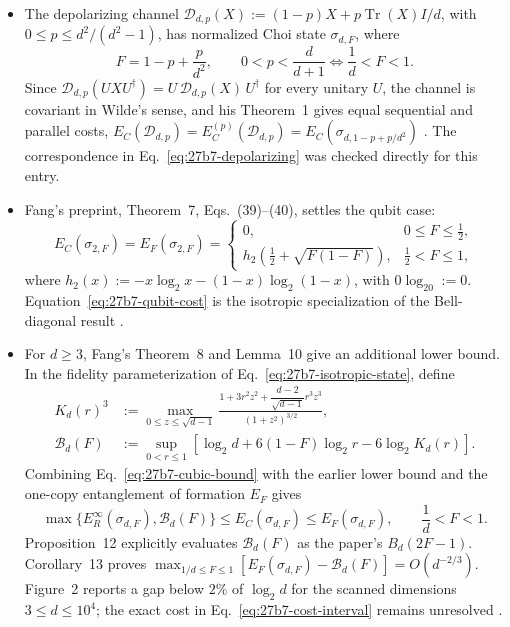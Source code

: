 \begin{itemize}
  \item The depolarizing channel
  $\mathcal D_{d,p}(X):=(1-p)X+p\operatorname{Tr}(X)I/d$, with
  $0\leq p\leq d^2/(d^2-1)$, has normalized Choi state $\sigma_{d,F}$, where
  \begin{equation}
    F=1-p+\frac{p}{d^2},
    \qquad
    0<p<\frac{d}{d+1}\iff\frac1d<F<1 .
    \label{eq:27b7-depolarizing}
  \end{equation}
  Since $\mathcal D_{d,p}(UXU^\dagger)=U\,\mathcal D_{d,p}(X)\,U^\dagger$ for
  every unitary $U$, the channel is covariant in Wilde's sense, and his
  Theorem~1 gives equal sequential and parallel costs,
  $E_C(\mathcal D_{d,p})=E_C^{(p)}(\mathcal D_{d,p})=E_C(\sigma_{d,1-p+p/d^2})$
  .  The correspondence in
  Eq.~\eqref{eq:27b7-depolarizing} was checked directly for this entry.

  \item Fang's preprint, Theorem~7, Eqs.~(39)--(40), settles the qubit case:
  \begin{equation}
    E_C(\sigma_{2,F})=E_F(\sigma_{2,F})=
    \begin{cases}
      0, & 0\leq F\leq\tfrac12,\\
      h_2\!\left(\tfrac12+\sqrt{F(1-F)}\right), & \tfrac12<F\leq1,
    \end{cases}
    \label{eq:27b7-qubit-cost}
  \end{equation}
  where $h_2(x):=-x\log_2x-(1-x)\log_2(1-x)$, with $0\log_20:=0$.
  Equation~\eqref{eq:27b7-qubit-cost} is the isotropic specialization of the
  Bell-diagonal result .

  \item For $d\geq3$, Fang's Theorem~8 and Lemma~10 give an additional lower
  bound.  In the fidelity parameterization of Eq.~\eqref{eq:27b7-isotropic-state},
  define
  \begin{equation}
    \begin{aligned}
      K_d(r)^3&:=\max_{0\leq z\leq\sqrt{d-1}}
        \frac{1+3r^2z^2+\dfrac{d-2}{\sqrt{d-1}}r^3z^3}{(1+z^2)^{3/2}},\\
      \mathcal B_d(F)&:=\sup_{0<r\leq1}
        \left[\log_2d+6(1-F)\log_2r-6\log_2K_d(r)\right].
    \end{aligned}
    \label{eq:27b7-cubic-bound}
  \end{equation}
  Combining Eq.~\eqref{eq:27b7-cubic-bound} with the earlier lower bound and
  the one-copy entanglement of formation $E_F$ gives
  \begin{equation}
    \max\{E_R^\infty(\sigma_{d,F}),\mathcal B_d(F)\}
      \leq E_C(\sigma_{d,F})\leq E_F(\sigma_{d,F}),
    \qquad \frac1d<F<1.
    \label{eq:27b7-cost-interval}
  \end{equation}
  Proposition~12 explicitly evaluates $\mathcal B_d(F)$ as the paper's
  $B_d(2F-1)$.  Corollary~13 proves
  $\max_{1/d\leq F\leq1}[E_F(\sigma_{d,F})-\mathcal B_d(F)]=O(d^{-2/3})$.
  Figure~2 reports a gap below $2\%$ of $\log_2d$ for the scanned dimensions
  $3\leq d\leq10^4$; the exact cost in Eq.~\eqref{eq:27b7-cost-interval}
  remains unresolved .
\end{itemize}

